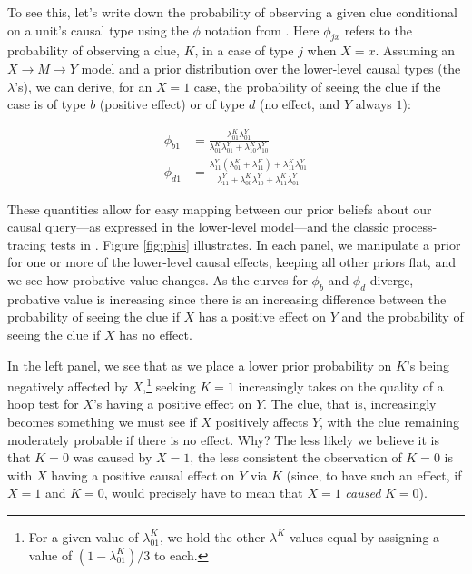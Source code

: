 \documentclass[
  12pt,
]{book}
\begin{document}
To see this, let's write down the probability of observing a given clue conditional on a unit's causal type using the \(\phi\) notation from \citet{humphreys2015mixing}. Here \(\phi_{jx}\) refers to the probability of observing a clue, \(K\), in a case of type \(j\) when \(X=x\). Assuming an \(X\rightarrow M \rightarrow Y\) model and a prior distribution over the lower-level causal types (the \(\lambda\)'s), we can derive, for an \(X=1\) case, the probability of seeing the clue if the case is of type \(b\) (positive effect) or of type \(d\) (no effect, and \(Y\) always \(1\)):

\begin{equation}
\begin{split}
\phi_{b1} & = \frac{\lambda_{01}^{K}\lambda_{01}^{Y}}{\lambda_{01}^{K}\lambda_{01}^{Y}+\lambda_{10}^{K}\lambda_{10}^{Y}}\\ 
\phi_{d1} & = \frac{\lambda_{11}^{Y}(\lambda_{01}^{K}+\lambda_{11}^{K})+\lambda_{11}^{K}\lambda_{01}^{Y}}{\lambda_{11}^{Y} + \lambda_{00}^{K}\lambda_{10}^{Y} + \lambda_{11}^{K}\lambda_{01}^{Y}}
\end{split}
\label{eqn:phisfromlambdas}
\end{equation}

These quantities allow for easy mapping between our prior beliefs about our causal query---as expressed in the lower-level model---and the classic process-tracing tests in \citet{Van-Evera:1997}. Figure \ref{fig:phis} illustrates. In each panel, we manipulate a prior for one or more of the lower-level causal effects, keeping all other priors flat, and we see how probative value changes. As the curves for \(\phi_b\) and \(\phi_d\) diverge, probative value is increasing since there is an increasing difference between the probability of seeing the clue if \(X\) has a positive effect on \(Y\) and the probability of seeing the clue if \(X\) has no effect.

In the left panel, we see that as we place a lower prior probability on \(K\)'s being negatively affected by \(X\),\footnote{For a given value of \(\lambda^K_{01}\), we hold the other \(\lambda^K\) values equal by assigning a value of \((1-\lambda^K_{01})/3\) to each.} seeking \(K=1\) increasingly takes on the quality of a hoop test for \(X\)'s having a positive effect on \(Y\). The clue, that is, increasingly becomes something we must see if \(X\) positively affects \(Y\), with the clue remaining moderately probable if there is no effect. Why? The less likely we believe it is that \(K=0\) was caused by \(X=1\), the less consistent the observation of \(K=0\) is with \(X\) having a positive causal effect on \(Y\) via \(K\) (since, to have such an effect, if \(X=1\) and \(K=0\), would precisely have to mean that \(X=1\) \emph{caused} \(K=0\)).
\end{document}
